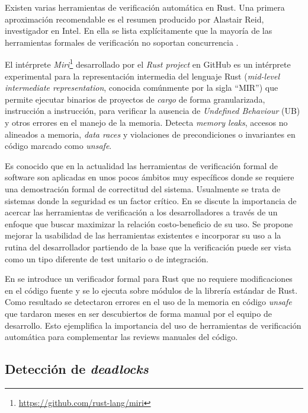 \documentclass[12pt]{article}
\begin{document}
Existen varias herramientas de verificación automática en Rust.
Una primera aproximación recomendable es el resumen producido por Alastair Reid, investigador en Intel.
En ella se lista explícitamente que la mayoría de las herramientas formales de verificación no soportan concurrencia \cite{reid2021}.

El intérprete \textit{Miri}\footnote{\url{https://github.com/rust-lang/miri}} desarrollado por el \textit{Rust project} en GitHub
es un intérprete experimental para la representación intermedia del lenguaje Rust
(\textit{mid-level intermediate representation}, conocida comúnmente por la sigla ``MIR'')
que permite ejecutar binarios de proyectos de \textit{cargo} de forma granularizada, instrucción a instrucción,
para verificar la ausencia de \textit{Undefined Behaviour} (UB) y otros errores en el manejo de la memoria.
Detecta \textit{memory leaks}, accesos no alineados a memoria, \textit{data races} y violaciones de precondiciones o invariantes en código marcado como \textit{unsafe}.

Es conocido que en la actualidad las herramientas de verificación formal de software son aplicadas en unos pocos ámbitos muy específicos
donde se requiere una demostración formal de correctitud del sistema. Usualmente se trata de sistemas donde la seguridad es un factor crítico.
En \cite{reid:hatra:2020} se discute la importancia de acercar las herramientas de verificación a los desarrolladores
a través de un enfoque que buscar maximizar la relación costo-beneficio de su uso.
Se propone mejorar la usabilidad de las herramientas existentes e incorporar su uso a la rutina del desarrollador partiendo
de la base que la verificación puede ser vista como un tipo diferente de test unitario o de integración.

En \cite{toman2015} se introduce un verificador formal para Rust que no requiere modificaciones en el código fuente y
se lo ejecuta sobre módulos de la librería estándar de Rust.
Como resultado se detectaron errores en el uso de la memoria en código \textit{unsafe}
que tardaron meses en ser descubiertos de forma manual por el equipo de desarrollo.
Esto ejemplifica la importancia del uso de herramientas de verificación automática para complementar las reviews manuales del código.

\subsection{Detección de \textit{deadlocks}}
\end{document}
